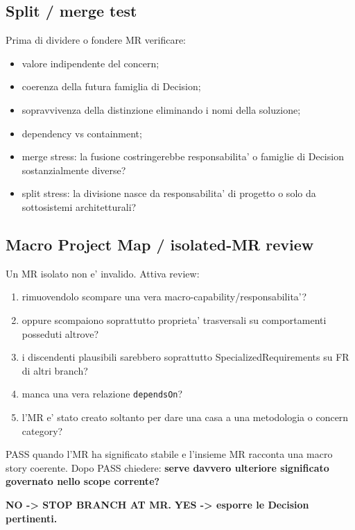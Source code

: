 \documentclass[11pt,a4paper]{article}
\begin{document}
\subsection{Split / merge test}
Prima di dividere o fondere MR verificare:
\begin{itemize}
  \item valore indipendente del concern;
  \item coerenza della futura famiglia di Decision;
  \item sopravvivenza della distinzione eliminando i nomi della soluzione;
  \item dependency vs containment;
  \item merge stress: la fusione costringerebbe responsabilita' o famiglie di Decision sostanzialmente diverse?
  \item split stress: la divisione nasce da responsabilita' di progetto o solo da sottosistemi architetturali?
\end{itemize}

\subsection{Macro Project Map / isolated-MR review}
\workingtag

Un MR isolato non e' invalido. Attiva review:
\begin{enumerate}
  \item rimuovendolo scompare una vera macro-capability/responsabilita'?
  \item oppure scompaiono soprattutto proprieta' trasversali su comportamenti posseduti altrove?
  \item i discendenti plausibili sarebbero soprattutto SpecializedRequirements su FR di altri branch?
  \item manca una vera relazione \texttt{dependsOn}?
  \item l'MR e' stato creato soltanto per dare una casa a una metodologia o concern category?
\end{enumerate}

\begin{ddtacheck}[title={Gate D1 - MR + STOP}]
PASS quando l'MR ha significato stabile e l'insieme MR racconta una macro story coerente. Dopo PASS chiedere: \textbf{serve davvero ulteriore significato governato nello scope corrente?}

\textbf{NO -> STOP BRANCH AT MR.}\quad
\textbf{YES -> esporre le Decision pertinenti.}
\end{ddtacheck}
\end{document}
